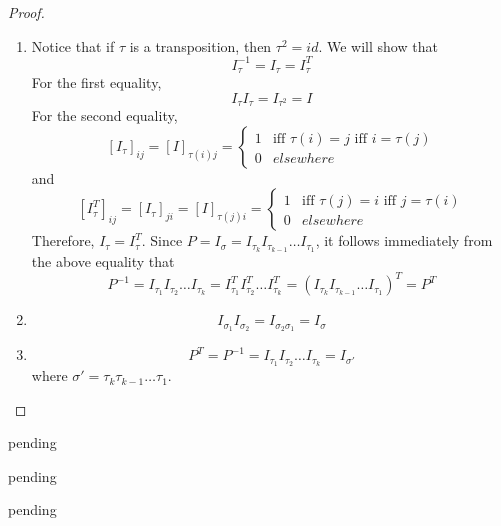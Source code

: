 \begin{problem}
\begin{proof}
\begin{enumerate}
            \item Notice that if \( \tau \) is a transposition, then \( \tau^2 = id \). We will show that
            \[
            I_{\tau}^{-1} = I_{\tau} = I_{\tau}^T
            \]
            For the first equality,
            \[
            I_\tau I_\tau = I_{\tau^2} = I
            \]
            For the second equality,
            \[
            [I_\tau]_{ij} = [I]_{\tau(i)j} = \begin{cases} 1 & \text{iff } \tau (i) = j \text{ iff } i = \tau(j) \\ 0 & elsewhere \end{cases}
            \]
            and
            \[
            [I_{\tau}^T]_{ij} = [I_\tau]_{ji} = [I]_{\tau(j)i} = \begin{cases} 1 & \text{iff } \tau (j) = i \text{ iff } j = \tau(i) \\ 0 & elsewhere \end{cases}
            \]
            Therefore, \( I_\tau = I_\tau^T \). Since \( P = I_\sigma = I_{\tau_k}I_{\tau_{k-1}}\ldots I_{\tau_1} \), it follows immediately from the above equality that
            \[
            P^{-1} = I_{\tau_1}I_{\tau_2}\ldots I_{\tau_k} = I_{\tau_1}^T I_{\tau_2}^T \ldots I_{\tau_k}^T = (I_{\tau_k}I_{\tau_{k-1}}\ldots I_{\tau_1})^T = P^T
            \]
            
            \item 
            \[
            I_{\sigma_1}I_{\sigma_2} = I_{\sigma_2 \sigma_1} = I_{\sigma}
            \]
            
            \item 
            \[
            P^T = P^{-1} = I_{\tau_1}I_{\tau_2}\ldots I_{\tau_k} = I_{\sigma'}
            \]
            where \( \sigma' = \tau_k\tau_{k-1}\ldots\tau_1 \).
        \end{enumerate}
    \end{proof}
\end{problem}

\begin{problem} \label{P.1.18}
    pending
\end{problem}

\begin{problem} \label{P.1.19}
    pending
\end{problem}

\begin{problem} \label{P.1.20}
    pending
\end{problem}

